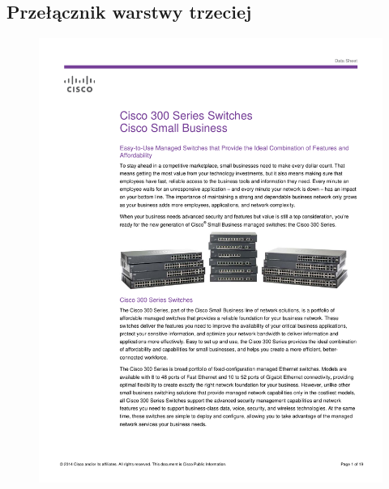 \documentclass[a4paper, 12pt]{article}
\begin{document}
\subsection{Przełącznik warstwy trzeciej}
\begin{figure}[H]
\centering
    \includegraphics[scale=0.80]{spec/sw3.pdf}
    \label{fig:PropProf}
\end{figure}
\end{document}
